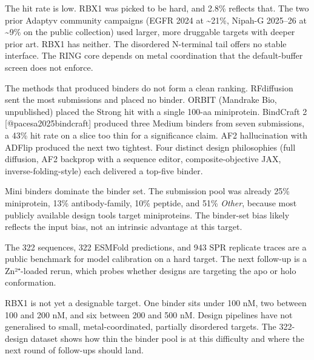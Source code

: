 The hit rate is low. RBX1 was picked to be hard, and 2.8\% reflects
that. The two prior Adaptyv community campaigns (EGFR 2024 at
\textasciitilde21\%, Nipah-G 2025--26 at \textasciitilde9\% on the
public collection) used larger, more druggable targets with deeper
prior art. RBX1 has neither. The disordered N-terminal tail offers no
stable interface. The RING core depends on metal coordination that the
default-buffer screen does not enforce.

The methods that produced binders do not form a clean ranking.
RFdiffusion sent the most submissions and placed no binder. ORBIT
(Mandrake Bio, unpublished) placed the Strong hit with a single 100-aa
miniprotein. BindCraft 2 {[}@pacesa2025bindcraft{]} produced three
Medium binders from seven submissions, a 43\% hit rate on a slice too
thin for a significance claim. AF2 hallucination with ADFlip produced
the next two tightest. Four distinct design philosophies (full
diffusion, AF2 backprop with a sequence editor, composite-objective
JAX, inverse-folding-style) each delivered a top-five binder.

Mini binders dominate the binder set. The submission pool was already
25\% miniprotein, 13\% antibody-family, 10\% peptide, and 51\%
\emph{Other}, because most publicly available design tools target
miniproteins. The binder-set bias likely reflects the input bias, not
an intrinsic advantage at this target.

The 322 sequences, 322 ESMFold predictions, and 943 SPR replicate
traces are a public benchmark for model calibration on a hard target.
The next follow-up is a Zn²⁺-loaded rerun, which probes whether
designs are targeting the apo or holo conformation.

RBX1 is not yet a designable target. One binder sits under 100 nM, two
between 100 and 200 nM, and six between 200 and 500 nM. Design
pipelines have not generalised to small, metal-coordinated, partially
disordered targets. The 322-design dataset shows how thin the binder
pool is at this difficulty and where the next round of follow-ups
should land.

